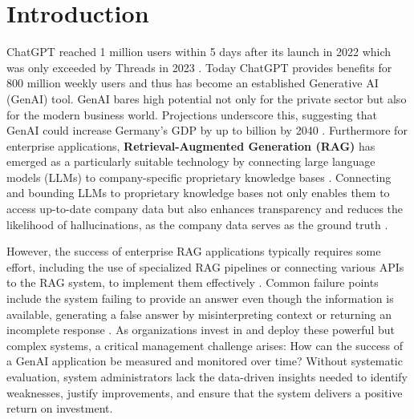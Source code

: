 \documentclass[
	english,
	ruledheaders=section,%
	class=report,%
	thesis={type=bachelor},%
	accentcolor=1b,%
	custommargins=true,%
	marginpar=false,%
	parskip=half-,%
	fontsize=11pt,%
	DIV=14,
]{tudapub}
\begin{document}
\chapter{Introduction}
ChatGPT reached 1 million users within 5 days after its launch in 2022 which was only exceeded by Threads in 2023 \parencite{Brandt2023}. Today ChatGPT provides benefits for 800 million weekly users \parencite{Huber2025} and thus has become an established Generative AI (GenAI) tool. GenAI bares high potential not only for the private sector but also for the modern business world. Projections underscore this, suggesting that GenAI could increase Germany's GDP by up to  billion by 2040 \parencite[p.~12]{McKinsey2023}. Furthermore for enterprise applications, \textbf{Retrieval-Augmented Generation (RAG)} has emerged as a particularly suitable technology by connecting large language models (LLMs) to company-specific proprietary knowledge bases \parencite[p.~6]{Sahin2024LLM_proceedings}. Connecting and bounding LLMs to proprietary knowledge bases not only enables them to access up-to-date company data but also enhances transparency and reduces the likelihood of hallucinations, as the company data serves as the ground truth \parencite{GoogleCloudRAG}.

However, the success of enterprise RAG applications typically requires some effort, including the use of specialized RAG pipelines or connecting various APIs to the RAG system, to implement them effectively \parencite[p.~6--7]{Bruckhaus2024RAG}. Common failure points include the system failing to provide an answer even though the information is available, generating a false answer by misinterpreting context or returning an incomplete response \parencite[p.~4]{Barnett_Kurniawan_Thudumu_Brannelly_Abdelrazek_2024}. As organizations invest in and deploy these powerful but complex systems, a critical management challenge arises: How can the success of a GenAI application be measured and monitored over time? Without systematic evaluation, system administrators lack the data-driven insights needed to identify weaknesses, justify improvements, and ensure that the system delivers a positive return on investment.
\end{document}

